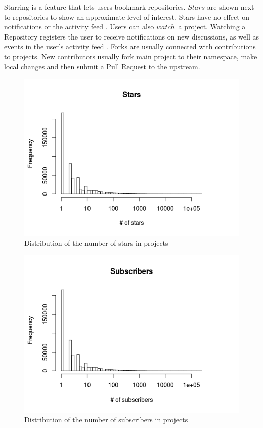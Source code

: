 \documentclass[thesis=M,english]{FITthesis}[2012/10/20]
\begin{document}
Starring is a feature that lets users bookmark repositories. $Stars$ are shown next to repositories to show an approximate level of interest. Stars have no effect on notifications or the activity feed \cite{gh_starring}. Users can also $watch$ a project. Watching a Repository registers the user to receive notifications on new discussions, as well as events in the user's activity feed \cite{gh_watching}.  Forks are usually connected with contributions to projects. New contributors usually fork main project to their namespace, make local changes and then submit a Pull Request to the upstream.

\begin{center}
\begin{figure}[ht]
	\includegraphics[totalheight=270pt]{images/meta_stars.png}
	\caption{Distribution of the number of stars in projects}
	\label{fig: meta_stars}
\end{figure}
\end{center}

\begin{center}
\begin{figure}[h!]
	\includegraphics[totalheight=270pt]{images/meta_subs.png}
	\caption{Distribution of the number of subscribers in projects}
	\label{fig: meta_subs}
\end{figure}
\end{center}
\end{document}
